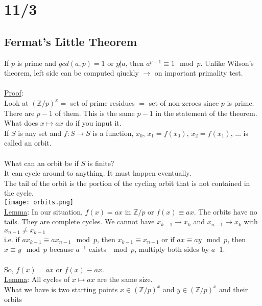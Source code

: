 \documentclass[13pt]{article}
\begin{document}
\section*{11/3}
	\subsection*{Fermat's Little Theorem}
		If $p$ is prime and $gcd(a,p) = 1$ or $p \not| a$, then
		$a^{p-1} \equiv 1 \mod p$. Unlike Wilson's theorem, left side can be
		computed qiuckly $\rightarrow$ on important primality test.\\\\
		\underline{Proof}:\\
			Look at $(\mathbb{Z}/p)^x = $ set of prime residues $=$ set of 
			non-zeroes since $p$ is prime.\\
			There are $p-1$ of them. This is the same $p-1$ in the statement of
			the theorem.\\
			What does $x \mapsto ax$ do if you input it.\\
			If $S$ is any set and $f: S \rightarrow S$ is a function, $x_0$,
			$x_1 = f(x_0)$, $x_2 = f(x_1)$, $\ldots$ is called an orbit.\\\\
			What can an orbit be if $S$ is finite?\\
			It can cycle around to anything. It must happen eventually.\\
			The tail of the orbit is the portion of the cycling orbit that
			is not contained in the cycle.\\
			\texttt{[image: orbits.png]}\\
		\underline{Lemma}: In our situation, $f(x) = ax$ in $\mathbb{Z}/p$ or
		$f(x) \equiv ax$. The orbits have no tails. They are complete cycles.
		We cannot have $x_{k-1} \rightarrow x_k$ and $x_{n-1} \rightarrow x_k$
		with $x_{n-1} \not= x_{k-1}$\\
		i.e. if $ax_{k-1} \equiv ax_{n-1} \mod p$, then $x_{k-1} \equiv x_{n-1}$
		or if $ax \equiv ay \mod p$, then $x \equiv y \mod p$ because $a^{-1}$
		exists $\mod p$, multiply both sides by $a^-1$.\\\\
		So, $f(x) = ax$ or $f(x) \equiv ax.$\\
		\underline{Lemma}: All cycles of $x \mapsto ax$ are the same size. \\
		What we have is two starting points $x \in (\mathbb{Z}/p)^x$ and
		$y \in (\mathbb{Z}/p)^x$ and their orbits\\
\end{document}
